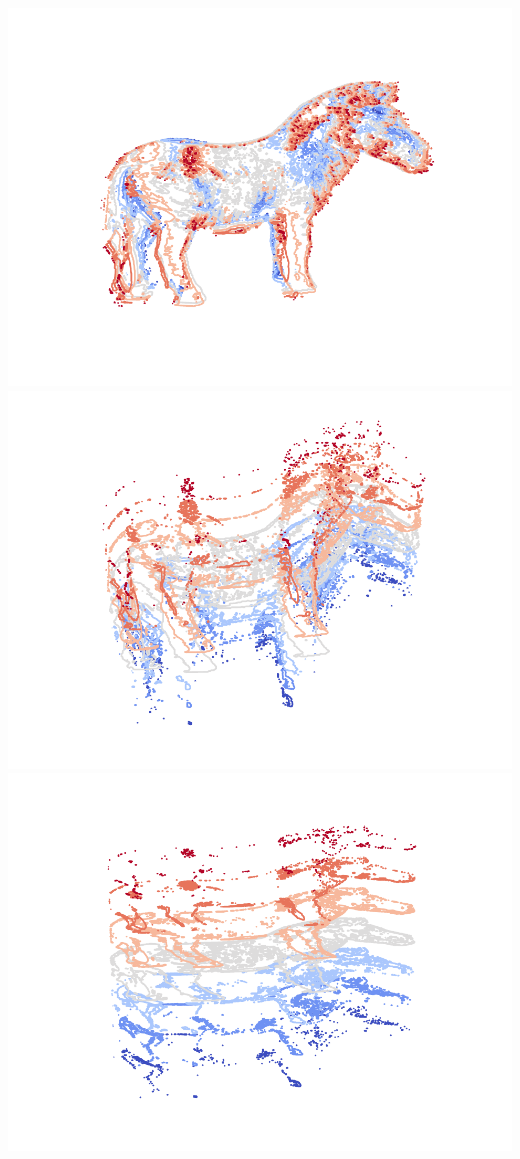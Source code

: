 {\centering
    \includegraphics[scale=0.6]{informe/imagenes/supnivel/supNivelCaballoLucesPropias578N1.pdf} \\
}
{\centering
    \includegraphics[scale=0.6]{informe/imagenes/supnivel/supNivelCaballoLucesPropias578N2.pdf} \\
}
{\centering
    \includegraphics[scale=0.6]{informe/imagenes/supnivel/supNivelCaballoLucesPropias578N3.pdf} \\
}

